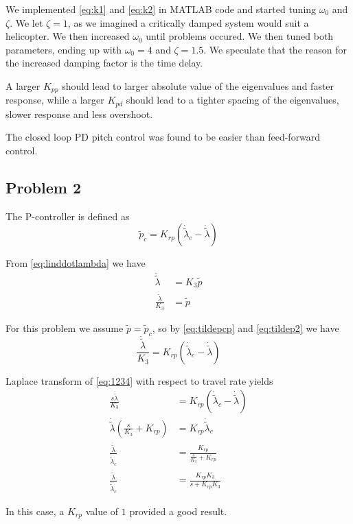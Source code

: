 We implemented \cref{eq:k1} and \cref{eq:k2} in MATLAB code and started tuning $\omega_0$ and $\zeta$. We let $\zeta=1$, as we imagined a critically damped system would suit a helicopter. We then increased $\omega_0$ until problems occured. We then tuned both parameters, ending up with $\omega_0 = 4$ and $\zeta=1.5$. We speculate that the reason for the increased damping factor is the time delay.

A larger $K_{pp}$ should lead to larger absolute value of the eigenvalues and faster response, while a larger $K_{pd}$ should lead to a tighter spacing of the eigenvalues, slower response and less overshoot.

The closed loop PD pitch control was found to be easier than feed-forward control.

\subsection{Problem 2}

The P-controller is defined as
\begin{equation}
	\tilde p_c = K_{rp}(\dot{\tilde{\lambda}}_c - \dot{\tilde{\lambda}}) \label{eq:tildepcp}
\end{equation}

From \cref{eq:linddotlambda} we have
\begin{subequations}
		\begin{align}
		\ddot{\tilde \lambda} &= K_3 \tilde p \\
		\frac{\ddot{\tilde \lambda}}{K_3} &= \tilde p
		\end{align}
		\label{eq:tildep2}
\end{subequations}

For this problem we assume $ \tilde p = \tilde p_c$, so by \cref{eq:tildepcp} and \cref{eq:tildep2} we have 
\begin{equation}
	\frac{\ddot{\tilde \lambda}}{K_3} = K_{rp}(\dot{\tilde{\lambda}}_c - \dot{\tilde{\lambda}}) \label{eq:1234}
\end{equation}

Laplace transform of \cref{eq:1234} with respect to travel rate yields
\begin{subequations}
		\begin{align}
		\frac{s \dot{\tilde \lambda}}{K_3} &= K_{rp}(\dot{\tilde{\lambda}}_c - \dot{\tilde{\lambda}}) \\
		\dot{\tilde \lambda}(\frac{s}{K_3} + K_{rp}) &= K_{rp}\dot{\tilde{\lambda}}_c \\
		\frac{\dot{\tilde{\lambda}}}{\dot{\tilde{\lambda}}_c} &= \frac{K_{rp}}{\frac{s}{K_3} + K_{rp}} \\
		\frac{\dot{\tilde{\lambda}}}{\dot{\tilde{\lambda}}_c} &= \frac{K_{rp} K_3}{s + K_{rp} K_3}
		\end{align}
\end{subequations}

In this case, a $K_{rp}$ value of $1$ provided a good result. 